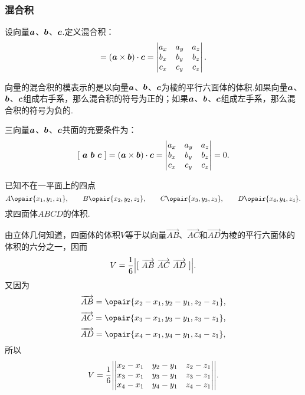 \subsubsection{混合积}
\begin{definition}
设向量\(\boldsymbol{a}\)、\(\boldsymbol{b}\)、\(\boldsymbol{c}\).定义混合积：\begin{equation}
[\ \mat{a}\ \mat{b}\ \mat{c}\ ]
= (\mat{a}\times\mat{b})\cdot\mat{c}
= \begin{vmatrix}
a_x & a_y & a_z \\
b_x & b_y & b_z \\
c_x & c_y & c_z
\end{vmatrix}.
\end{equation}

向量的混合积的模表示的是以向量\(\boldsymbol{a}\)、\(\boldsymbol{b}\)、\(\boldsymbol{c}\)为棱的平行六面体的体积.如果向量\(\boldsymbol{a}\)、\(\boldsymbol{b}\)、\(\boldsymbol{c}\)组成右手系，那么混合积的符号为正的；如果\(\boldsymbol{a}\)、\(\boldsymbol{b}\)、\(\boldsymbol{c}\)组成左手系，那么混合积的符号为负的.
\end{definition}

\begin{theorem}
三向量\(\boldsymbol{a}\)、\(\boldsymbol{b}\)、\(\boldsymbol{c}\)共面的充要条件为：\[
[\ \boldsymbol{a}\ \boldsymbol{b}\ \boldsymbol{c}\ ]
= (\boldsymbol{a}\times\boldsymbol{b})\cdot\boldsymbol{c}
= \begin{vmatrix}
a_x & a_y & a_z \\
b_x & b_y & b_z \\
c_x & c_y & c_z
\end{vmatrix}
= 0.
\]
\end{theorem}

\begin{example}
已知不在一平面上的四点\[
A\opair{x_1,y_1,z_1},
\qquad
B\opair{x_2,y_2,z_2},
\qquad
C\opair{x_3,y_3,z_3},
\qquad
D\opair{x_4,y_4,z_4}.
\]求四面体\(ABCD\)的体积.
\begin{solution}
由立体几何知道，四面体的体积\(V\)等于以向量\(\vec{AB}\)、\(\vec{AC}\)和\(\vec{AD}\)为棱的平行六面体的体积的六分之一，因而\[
V = \frac{1}{6} \abs{ [\ \vec{AB}\ \vec{AC}\ \vec{AD}\ ] }.
\]又因为\[
\vec{AB} = \opair{x_2-x_1,y_2-y_1,z_2-z_1},
\]\[
\vec{AC} = \opair{x_3-x_1,y_3-y_1,z_3-z_1},
\]\[
\vec{AD} = \opair{x_4-x_1,y_4-y_1,z_4-z_1},
\]所以\[
V = \frac{1}{6} \abs{ \begin{vmatrix}
x_2-x_1 & y_2-y_1 & z_2-z_1 \\
x_3-x_1 & y_3-y_1 & z_3-z_1 \\
x_4-x_1 & y_4-y_1 & z_4-z_1
\end{vmatrix} }.
\]
\end{solution}
\end{example}

